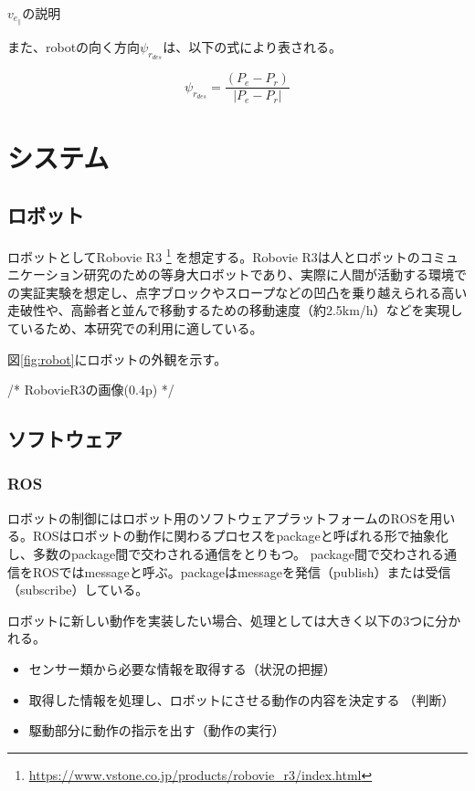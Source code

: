\documentclass{kuisthesis}
\begin{document}
$v_e_{\parallel}$の説明

また、robotの向く方向$\psi_r_{des}$は、以下の式により表される。

\begin{equation}
	\psi_r_{des} = \frac{(P_e - P_r)}{|P_e - P_r|} \nonumber
\end{equation}








\section{システム}

\subsection{ロボット}

ロボットとしてRobovie R3 \footnote{\url{https://www.vstone.co.jp/products/robovie_r3/index.html}} を想定する。Robovie R3は人とロボットのコミュニケーション研究のための等身大ロボットであり、実際に人間が活動する環境での実証実験を想定し、点字ブロックやスロープなどの凹凸を乗り越えられる高い走破性や、高齢者と並んで移動するための移動速度（約2.5km/h）などを実現しているため、本研究での利用に適している。

図\ref{fig:robot}にロボットの外観を示す。

/* RobovieR3の画像(0.4p) */

\subsection{ソフトウェア}


\subsubsection*{ROS}
ロボットの制御にはロボット用のソフトウェアプラットフォームのROSを用いる。ROSはロボットの動作に関わるプロセスをpackageと呼ばれる形で抽象化し、多数のpackage間で交わされる通信をとりもつ。
package間で交わされる通信をROSではmessageと呼ぶ。packageはmessageを発信（publish）または受信（subscribe）している。

ロボットに新しい動作を実装したい場合、処理としては大きく以下の3つに分かれる。
\begin{itemize}
	\item センサー類から必要な情報を取得する（状況の把握）
	\item 取得した情報を処理し、ロボットにさせる動作の内容を決定する（判断）
	\item 駆動部分に動作の指示を出す（動作の実行）
\end{itemize}
\end{document}
